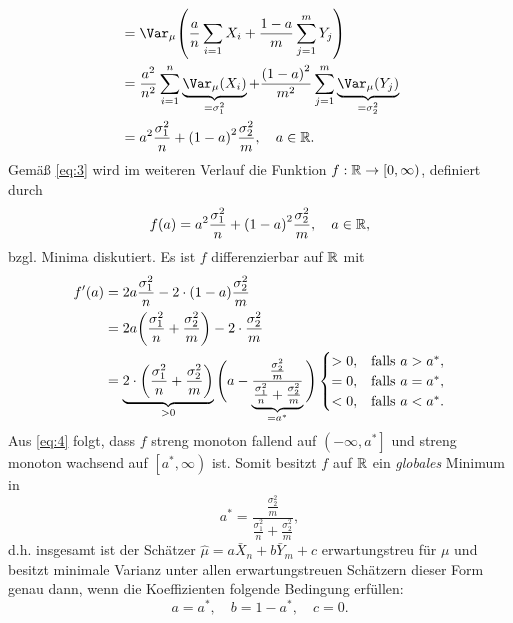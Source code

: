 \documentclass{exercise}
\begin{document}
\begin{enumerate}
\begin{align}
            &= \Var_\mu\parentheses*{\frac{a}{n}\sum_{i = 1}X_i + \frac{1 - a}{m}\sum_{j = 1}^m Y_j}\nonumber\\
            &= \frac{a^2}{n^2}\sum_{i = 1}^n \underbrace{\Var_\mu\parentheses*{X_i}}_{= \sigma_1^2} + \frac{\parentheses*{1 - a}^2}{m^2}\sum_{j = 1}^m \underbrace{\Var_\mu\parentheses*{Y_j}}_{= \sigma_2^2}\nonumber\\
            &= a^2 \frac{\sigma_1^2}{n} + \parentheses*{1 - a}^2 \frac{\sigma_2^2}{m}, \quad a \in \R.\label{eq:3}
        \end{align}
        Gemäß \eqref{eq:3} wird im weiteren Verlauf die Funktion \(f: \mathbb{R} \to \left[0, \infty\right)\), definiert durch
        \[
            f\parentheses*{a} = a^2 \frac{\sigma_1^2}{n} + \parentheses*{1 - a}^2 \frac{\sigma_2^2}{m}, \quad a \in \R,
        \]
        bzgl. Minima diskutiert.
        Es ist \(f\) differenzierbar auf \(\mathbb{R}\) mit
        \begin{align}
            f'\parentheses*{a} &= 2a\frac{\sigma_1^2}{n} - 2 \cdot \parentheses*{1 - a}\frac{\sigma_2^2}{m}\nonumber\\
            &= 2a\parentheses*{\frac{\sigma_1^2}{n} + \frac{\sigma_2^2}{m}} - 2 \cdot \frac{\sigma_2^2}{m}\nonumber\\
            &= \underbrace{2 \cdot \parentheses*{\frac{\sigma_1^2}{n} + \frac{\sigma_2^2}{m}}}_{> 0}\Bigg(a - \underbrace{\frac{\frac{\sigma_2^2}{m}}{\frac{\sigma_1^2}{n} + \frac{\sigma_2^2}{m}}}_{= a^*}\Bigg)\begin{cases}
                > 0, & \text{falls }a > a^*,\\
                = 0, & \text{falls }a = a^*,\\
                < 0, & \text{falls }a < a^*.
            \end{cases}\label{eq:4}
        \end{align}
        Aus \eqref{eq:4} folgt, dass \(f\) streng monoton fallend auf \(\left(-\infty, a^*\right]\) und streng monoton wachsend auf \(\left[a^*, \infty\right)\) ist.
        Somit besitzt \(f\) auf \(\mathbb{R}\) ein \emph{globales} Minimum in
        \[
            a^* = \frac{\frac{\sigma_2^2}{m}}{\frac{\sigma_1^2}{n} + \frac{\sigma_2^2}{m}},
        \]
        d.h. insgesamt ist der Schätzer \(\hat{\mu} = a\bar{X}_n + b\bar{Y}_m + c\) erwartungstreu für \(\mu\) und besitzt minimale Varianz unter allen erwartungstreuen Schätzern dieser Form genau dann, wenn die Koeffizienten folgende Bedingung erfüllen:
        \[
            a = a^*, \quad b = 1 - a^*, \quad c = 0.
        \]

\end{enumerate}
\end{document}
